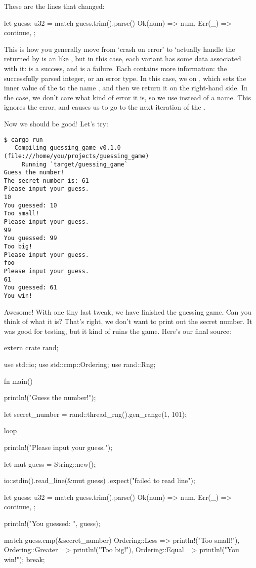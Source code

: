 These are the lines that changed:

\begin{rustc}
let guess: u32 = match guess.trim().parse() {
    Ok(num) => num,
    Err(_) => continue,
};
\end{rustc}

This is how you generally move from ‘crash on error’ to ‘actually handle the returned by  is an  like
, but in this case, each variant has some data associated with it:  is a success, and  is a
failure. Each contains more information: the successfully parsed integer, or an error type. In this case, we  on 
, which sets the inner value of the  to the name , and then we return it on the right-hand side. 
In the  case, we don’t care what kind of error it is, so we use \code{\_} instead of a name. This ignores the error, and
 causes us to go to the next iteration of the .

\blank

Now we should be good! Let’s try:

\begin{verbatim}
$ cargo run
   Compiling guessing_game v0.1.0 (file:///home/you/projects/guessing_game)
     Running `target/guessing_game`
Guess the number!
The secret number is: 61
Please input your guess.
10
You guessed: 10
Too small!
Please input your guess.
99
You guessed: 99
Too big!
Please input your guess.
foo
Please input your guess.
61
You guessed: 61
You win!
\end{verbatim}

Awesome! With one tiny last tweak, we have finished the guessing game. Can you think of what it is? That’s right, we don’t want 
to print out the secret number. It was good for testing, but it kind of ruins the game. Here’s our final source:

\begin{rustc}
extern crate rand;

use std::io;
use std::cmp::Ordering;
use rand::Rng;

fn main() {
    println!("Guess the number!");

    let secret_number = rand::thread_rng().gen_range(1, 101);

    loop {
        println!("Please input your guess.");

        let mut guess = String::new();

        io::stdin().read_line(&mut guess)
            .expect("failed to read line");

        let guess: u32 = match guess.trim().parse() {
            Ok(num) => num,
            Err(_) => continue,
        };

        println!("You guessed: {}", guess);

        match guess.cmp(&secret_number) {
            Ordering::Less    => println!("Too small!"),
            Ordering::Greater => println!("Too big!"),
            Ordering::Equal   => {
                println!("You win!");
                break;
            }
        }
    }
}
\end{rustc}


